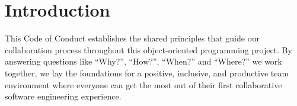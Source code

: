 \section{Introduction}

This Code of Conduct establishes the shared principles that guide our collaboration process throughout this
object-oriented programming project.
By answering questions like ``Why?'', ``How?'', ``When?'' and ``Where?'' we work together,
we lay the foundations for a positive, inclusive, and productive team environment where everyone can get the most
out of their first collaborative software engineering experience.
